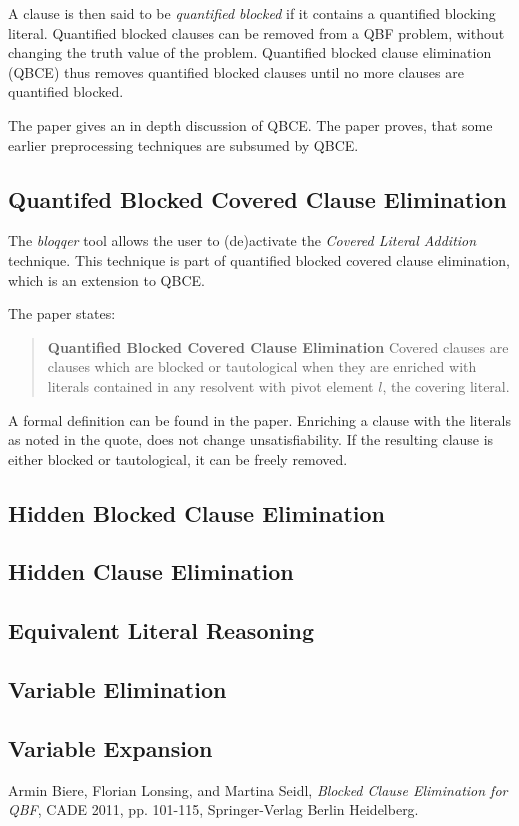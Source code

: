 \documentclass{scrartcl}
\begin{document}
A clause is then said to be \emph{quantified blocked} if it contains a
quantified blocking literal. Quantified blocked clauses can be removed from a
QBF problem, without changing the truth value of the problem. 
Quantified blocked clause elimination (QBCE) thus removes quantified blocked clauses
until no more clauses are quantified blocked. 

The paper gives an in depth discussion of QBCE. The paper proves, that some
earlier preprocessing techniques are subsumed by QBCE.

\subsection{Quantifed Blocked Covered Clause Elimination}
The \emph{bloqqer} tool allows the user to (de)activate the \emph{Covered
Literal Addition} technique. This technique is part of quantified blocked
covered clause elimination, which is an extension to QBCE.

The paper states: 
\begin{quote}\textbf{Quantified Blocked Covered Clause Elimination}
Covered clauses are clauses which are blocked or tautological when they are
enriched with literals contained in any resolvent with pivot element $l$, the
covering literal.
\end{quote}
A formal definition can be found in the paper.
Enriching a clause with the literals as noted in the quote, does not change
unsatisfiability. If the resulting clause is either blocked or tautological, it
can be freely removed. 

\subsection{Hidden Blocked Clause Elimination}

\subsection{Hidden Clause Elimination}

\subsection{Equivalent Literal Reasoning}
\subsection{Variable Elimination}
\subsection{Variable Expansion}
    
\begin{thebibliography}{9}
Armin Biere, Florian Lonsing, and Martina Seidl,
\emph{Blocked Clause Elimination for QBF},
CADE 2011,
pp. 101-115,
Springer-Verlag Berlin Heidelberg.
\end{thebibliography}
\end{document}
